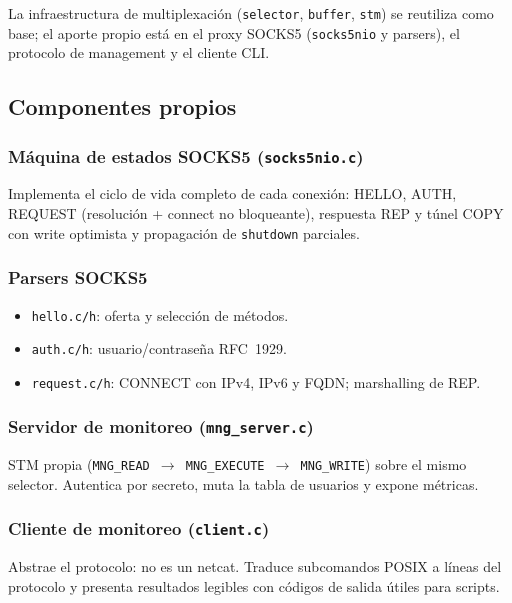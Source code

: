 \documentclass[12pt,a4paper]{article}
\begin{document}
La infraestructura de multiplexación (\texttt{selector}, \texttt{buffer},
\texttt{stm}) se reutiliza como base; el aporte propio está en el proxy SOCKS5
(\texttt{socks5nio} y parsers), el protocolo de management y el cliente CLI.

\subsection{Componentes propios}

\subsubsection{Máquina de estados SOCKS5 (\texttt{socks5nio.c})}

Implementa el ciclo de vida completo de cada conexión: HELLO, AUTH, REQUEST
(resolución + connect no bloqueante), respuesta REP y túnel COPY con write
optimista y propagación de \texttt{shutdown} parciales.

\subsubsection{Parsers SOCKS5}

\begin{itemize}
    \item \texttt{hello.c/h}: oferta y selección de métodos.
    \item \texttt{auth.c/h}: usuario/contraseña RFC~1929.
    \item \texttt{request.c/h}: CONNECT con IPv4, IPv6 y FQDN; marshalling de REP.
\end{itemize}

\subsubsection{Servidor de monitoreo (\texttt{mng\_server.c})}

STM propia (\texttt{MNG\_READ $\rightarrow$ MNG\_EXECUTE $\rightarrow$ MNG\_WRITE})
sobre el mismo selector. Autentica por secreto, muta la tabla de usuarios y expone
métricas.

\subsubsection{Cliente de monitoreo (\texttt{client.c})}

Abstrae el protocolo: no es un netcat. Traduce subcomandos POSIX a líneas del
protocolo y presenta resultados legibles con códigos de salida útiles para scripts.
\end{document}
